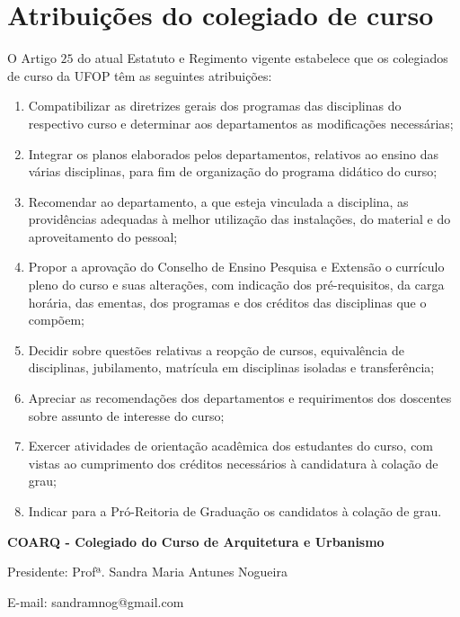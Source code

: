 \section{Atribuições do colegiado de curso}
O Artigo $25$ do atual Estatuto e Regimento vigente estabelece que os colegiados de curso da UFOP têm as seguintes atribuições:
\begin{enumerate}
	\item Compatibilizar as diretrizes gerais dos programas das disciplinas do respectivo curso e determinar aos departamentos as modificações necessárias;
	
	\item Integrar os planos elaborados pelos departamentos, relativos ao ensino das várias disciplinas, para fim de organização do programa didático do curso;
	
	\item Recomendar ao departamento, a que esteja vinculada a disciplina, as providências adequadas à melhor utilização das instalações, do material e do aproveitamento do pessoal;
	
	\item Propor a aprovação do Conselho de Ensino Pesquisa e Extensão o currículo pleno do curso e suas alterações, com indicação dos pré-requisitos, da carga horária, das ementas, dos programas e dos créditos das disciplinas que o compõem;
	
	\item Decidir sobre questões relativas a reopção de cursos, equivalência de disciplinas, jubilamento, matrícula em disciplinas isoladas e transferência;
	
	\item Apreciar as recomendações dos departamentos e requirimentos dos doscentes sobre assunto de interesse do curso;
	
	\item Exercer atividades de orientação acadêmica dos estudantes do curso, com vistas ao cumprimento dos créditos necessários à candidatura à colação de grau;
	
	\item Indicar para a Pró-Reitoria de Graduação os candidatos à colação de grau.
\end{enumerate}

\textbf{COARQ - Colegiado do Curso de Arquitetura e Urbanismo}

Presidente: Profª. Sandra Maria Antunes Nogueira

E-mail: sandramnog@gmail.com

